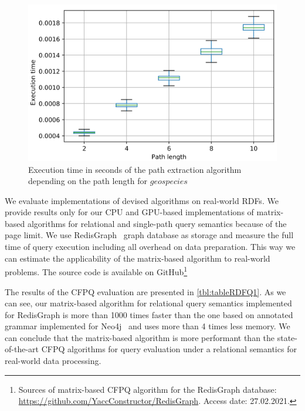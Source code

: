 \documentclass[sigconf, nonacm]{acmart}
\begin{document}
\begin{figure}
	\centering	
	\includegraphics[width=0.65\linewidth]{plots/geo.png}
	\caption{Execution time in seconds of the path extraction algorithm depending on the path length for $geospecies$}
	\label{fig:extractTime}
\end{figure}

We evaluate implementations of devised algorithms on real-world RDFs. We provide results only for our CPU and GPU-based implementations of matrix-based algorithms for relational and single-path query semantics because of the page limit. We use RedisGraph~\cite{8778293} graph database as storage and measure the full time of query execution including all overhead on data preparation. This way we can estimate the applicability of the matrix-based algorithm to real-world problems. The source code is available on GitHub\footnote{Sources of matrix-based CFPQ algorithm for the RedisGraph database: \url{https://github.com/YaccConstructor/RedisGraph}. Access date: 27.02.2021.}


The results of the CFPQ evaluation are presented in \autoref{tbl:tableRDFQ1}. As we can see, our matrix-based algorithm for relational query semantics implemented for RedisGraph is more than 1000 times faster than the one based on annotated grammar implemented for Neo4j~\cite{Kuijpers:2019:ESC:3335783.3335791} and uses more than 4 times less memory.
We can conclude that the matrix-based algorithm is more performant than the state-of-the-art CFPQ algorithms for query evaluation under a relational semantics for real-world data processing.

\end{document}
